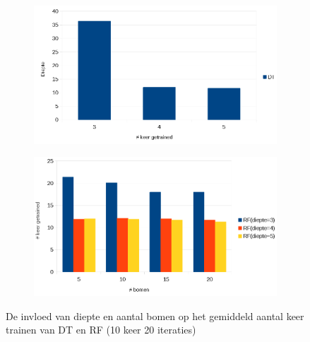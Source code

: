 \begin{figure}[t!]
\centering
\begin{subfigure}{\textwidth}
  \centering
    \hspace*{-0.75cm}                                                           
  \includegraphics[width=\linewidth]{images/evaluatie/aantalkeertrainendt.png}
\end{subfigure}
\begin{subfigure}{\textwidth}
  \centering
  \includegraphics[width=\linewidth]{images/evaluatie/aantalkeertrainenrf.png}
\end{subfigure}
\caption{De invloed van diepte en aantal bomen op het gemiddeld aantal keer trainen van DT en RF (10 keer 20 iteraties)}
\label{fig:invloed diepte en aantal bomen trainen}
\end{figure}
